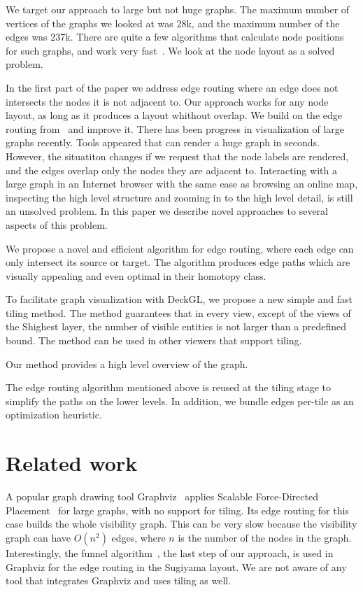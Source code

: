 \documentclass{gd-llncs}
\begin{document}
We target our approach to large but not huge graphs. The maximum number of vertices of the graphs we looked at was 28k, and the maximum number of the edges was 237k. There are quite a few algorithms that calculate node positions for such graphs, and work very fast~\cite{hu2015visualizing,brandes2007eigensolver}. We look at the node layout as a solved problem.

In the first part of the paper we address edge routing where an edge does not intersects the nodes it is not adjacent to. Our approach works for any node layout, as long as it produces a layout whithout overlap. We build on the edge routing from~\cite{dwyer2010fast} and improve it.
There has been progress in visualization of large graphs recently. Tools appeared that can render a huge graph in seconds. However, the situatiton changes if we request that the node labels are rendered, and the edges overlap only the nodes they are adjacent to. Interacting with a large graph in an Internet browser with the same ease as browsing an online map, inspecting the high level structure and zooming in to the high level detail, is still an unsolved problem. In this paper we describe novel approaches to several aspects of this problem.

We propose a novel and efficient algorithm for edge routing, where each edge can only intersect its source or target. The algorithm produces edge paths which are visually appealing and even optimal in their homotopy class.

To facilitate graph visualization with DeckGL, we propose a new simple and fast tiling method. The method guarantees that in every view, 
except of the views of the Shighest layer, the number of visible entities is not larger than a 
predefined bound. The method can be used in other viewers that support tiling.

Our method provides a high level overview of the graph.

The edge routing algorithm mentioned above is reused at the tiling stage to simplify the paths on the lower levels. In addition, we bundle edges per-tile as an optimization heuristic.
\section*{Related work}
A popular graph drawing tool Graphviz~\cite{graphviz} applies
Scalable Force-Directed Placement~\cite{sfdp} for large graphs, with no
support for tiling. Its edge routing for this case builds the whole
visibility graph. This can be very slow because the visibility graph can have $O(n^2)$ edges,
where $n$ is the number of the nodes in the graph.
Interestingly, the funnel algorithm~\cite{chazelle1982theorem,hershberger1994computing},
the last step of our approach, is used in Graphviz for the edge routing in the
Sugiyama layout. We are not aware of any tool that integrates Graphviz
and uses tiling as well.
\end{document}
